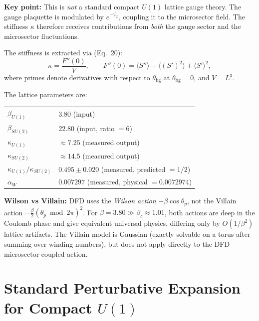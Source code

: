 \documentclass[11pt]{article}
\begin{document}
\noindent\textbf{Key point:} This is \emph{not} a standard compact $U(1)$
lattice gauge theory.  The gauge plaquette is modulated by $e^{-\psi_p}$,
coupling it to the microsector field.  The stiffness $\kappa$ therefore
receives contributions from \emph{both} the gauge sector and the
microsector fluctuations.

The stiffness is extracted via (Eq.~20):
\begin{equation}\label{eq:kappa_def}
  \kappa = \frac{F''(0)}{V}, \qquad
  F''(0) = \langle S''\rangle - \langle (S')^2\rangle + \langle S'\rangle^2,
\end{equation}
where primes denote derivatives with respect to $\theta_{\mathrm{bg}}$
at $\theta_{\mathrm{bg}} = 0$, and $V = L^3$.

The lattice parameters are:
\begin{center}
\begin{tabular}{ll}
\toprule
$\beta_{U(1)}$ & $3.80$ (input) \\
$\beta_{SU(2)}$ & $22.80$ (input, ratio $= 6$) \\
$\kappa_{U(1)}$ & $\approx 7.25$ (measured output) \\
$\kappa_{SU(2)}$ & $\approx 14.5$ (measured output) \\
$\kappa_{U(1)}/\kappa_{SU(2)}$ & $0.495 \pm 0.020$ (measured, predicted $= 1/2$) \\
$\alpha_W$ & $0.007297$ (measured, physical $= 0.0072974$) \\
\bottomrule
\end{tabular}
\end{center}

\noindent\textbf{Wilson vs Villain:} DFD uses the \emph{Wilson action}
$-\beta\cos\theta_p$, not the Villain action
$-\frac{\beta}{2}(\theta_p \bmod 2\pi)^2$.
For $\beta = 3.80 \gg \beta_c \approx 1.01$, both actions are
deep in the Coulomb phase and give equivalent universal physics,
differing only by $O(1/\beta^2)$ lattice artifacts.
The Villain model is Gaussian (exactly solvable on a torus after
summing over winding numbers), but does not apply directly to the
DFD microsector-coupled action.


\section{Standard Perturbative Expansion for Compact $U(1)$}
\end{document}

